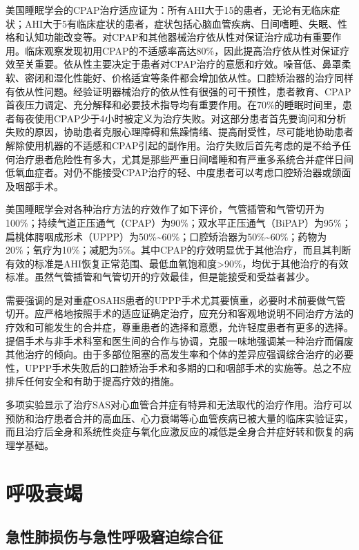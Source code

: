 美国睡眠学会的CPAP治疗适应证为：所有AHI大于15的患者，无论有无临床症状；AHI大于5有临床症状的患者，症状包括心脑血管疾病、日间嗜睡、失眠、性格和认知功能改变等。对CPAP和其他器械治疗依从性对保证治疗成功有重要作用。临床观察发现初用CPAP的不适感率高达80\%，因此提高治疗依从性对保证疗效至关重要。依从性主要决定于患者对CPAP治疗的意愿和疗效。噪音低、鼻罩柔软、密闭和湿化性能好、价格适宜等条件都会增加依从性。口腔矫治器的治疗同样有依从性问题。经验证明器械治疗的依从性有很强的可干预性，患者教育、CPAP首夜压力调定、充分解释和必要技术指导均有重要作用。在70\%的睡眠时间里，患者每夜使用CPAP少于4小时被定义为治疗失败。对这部分患者首先要询问和分析失败的原因，协助患者克服心理障碍和焦躁情绪、提高耐受性，尽可能地协助患者解除使用机器的不适感和CPAP引起的副作用。治疗失败后首先考虑的是不给予任何治疗患者危险性有多大，尤其是那些严重日间嗜睡和有严重多系统合并症伴日间低氧血症者。对仍不能接受CPAP治疗的轻、中度患者可以考虑口腔矫治器或颌面及咽部手术。

美国睡眠学会对各种治疗方法的疗效作了如下评价，气管插管和气管切开为100\%；持续气道正压通气（CPAP）为90\%；双水平正压通气（BiPAP）为95\%；扁桃体腭咽成形术（UPPP）为50\%\textasciitilde{}60\%；口腔矫治器为50\%\textasciitilde{}60\%；药物为20\%；氧疗为10\%；减肥为5\%。其中CPAP的疗效明显优于其他治疗，而且其判断有效的标准是AHI恢复正常范围、最低血氧饱和度\textgreater{}90\%，均优于其他治疗的有效标准。虽然气管插管和气管切开的疗效最佳，但是能接受和受益者甚少。

需要强调的是对重症OSAHS患者的UPPP手术尤其要慎重，必要时术前要做气管切开。应严格地按照手术的适应证确定治疗，应充分和客观地说明不同治疗方法的疗效和可能发生的合并症，尊重患者的选择和意愿，允许轻度患者有更多的选择。提倡手术与非手术科室和医生间的合作与协调，克服一味地强调某一种治疗而偏废其他治疗的倾向。由于多部位阻塞的高发生率和个体的差异应强调综合治疗的必要性，UPPP手术失败后的口腔矫治手术和多期的口和咽部手术的实施等。总之不应排斥任何安全和有助于提高疗效的措施。

多项实验显示了治疗SAS对心血管合并症有特异和无法取代的治疗作用。治疗可以预防和治疗患者合并的高血压、心力衰竭等心血管疾病已被大量的临床实验证实，而且治疗后全身和系统性炎症与氧化应激反应的减低是全身合并症好转和恢复的病理学基础。

\section{呼吸衰竭}

\subsection{急性肺损伤与急性呼吸窘迫综合征}

